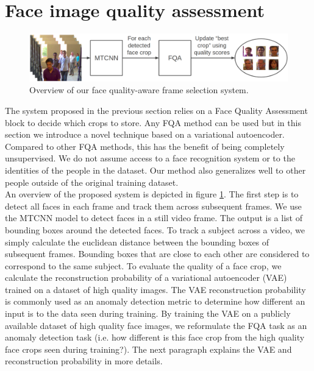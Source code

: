 \documentclass[letterpaper]{article} %
\begin{document}
\section{Face image quality assessment}
\label{section:approach}
\begin{figure}[t]
    \centering
    \includegraphics[width=\linewidth]{figures/FQA_overview.png}
    \caption{Overview of our face quality-aware frame selection system.}
    \label{fig:fqa_overview}
\end{figure}
The system proposed in the previous section relies on a Face Quality Assessment block to decide which crops to store. Any FQA method can be used but in this section we introduce a novel technique based on a variational autoencoder. Compared to other FQA methods, this has the benefit of being completely unsupervised. We do not assume access to a face recognition system or to the identities of the people in the dataset. Our method also generalizes well to other people outside of the original training dataset.
\\
\newline
 An overview of the proposed system is depicted in figure \ref{fig:fqa_overview}. The first step is to detect all faces in each frame and track them across subsequent frames. We use the MTCNN model \cite{zhang2016joint} to detect faces in a still video frame. The output is a list of bounding boxes around the detected faces. To track a subject across a video, we simply calculate the euclidean distance between the bounding boxes of subsequent frames. Bounding boxes that are close to each other are considered to correspond to the same subject. To evaluate the quality of a face crop, we calculate the reconstruction probability of a variational autoencoder (VAE) trained on a dataset of high quality images. The VAE reconstruction probability is commonly used as an anomaly detection metric \cite{an2015variational} to determine how different an input is to the data seen during training. By training the VAE on a publicly available dataset of high quality face images, we reformulate the FQA task as an anomaly detection task (i.e. how different is this face crop from the high quality face crops seen during training?). The next paragraph explains the VAE and reconstruction probability in more details.
\end{document}
